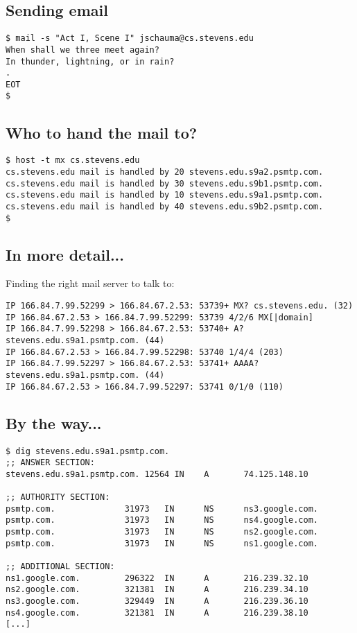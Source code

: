 \documentclass[xga]{xdvislides}
\begin{document}
\subsection{Sending email}
\begin{verbatim}
$ mail -s "Act I, Scene I" jschauma@cs.stevens.edu
When shall we three meet again?
In thunder, lightning, or in rain?
.
EOT
$
\end{verbatim}

\subsection{Who to hand the mail to?}
\newcommand{\smallish}{\fontsize{16}{16}\selectfont}
\begin{verbatim}
$ host -t mx cs.stevens.edu
cs.stevens.edu mail is handled by 20 stevens.edu.s9a2.psmtp.com.
cs.stevens.edu mail is handled by 30 stevens.edu.s9b1.psmtp.com.
cs.stevens.edu mail is handled by 10 stevens.edu.s9a1.psmtp.com.
cs.stevens.edu mail is handled by 40 stevens.edu.s9b2.psmtp.com.
$
\end{verbatim}
\Normalsize

\subsection{In more detail...}
Finding the right mail server to talk to:
\begin{verbatim}
IP 166.84.7.99.52299 > 166.84.67.2.53: 53739+ MX? cs.stevens.edu. (32)
IP 166.84.67.2.53 > 166.84.7.99.52299: 53739 4/2/6 MX[|domain]
IP 166.84.7.99.52298 > 166.84.67.2.53: 53740+ A? stevens.edu.s9a1.psmtp.com. (44)
IP 166.84.67.2.53 > 166.84.7.99.52298: 53740 1/4/4 (203)
IP 166.84.7.99.52297 > 166.84.67.2.53: 53741+ AAAA? stevens.edu.s9a1.psmtp.com. (44)
IP 166.84.67.2.53 > 166.84.7.99.52297: 53741 0/1/0 (110)
\end{verbatim}
\Normalsize

\subsection{By the way...}
\begin{verbatim}
$ dig stevens.edu.s9a1.psmtp.com.
;; ANSWER SECTION:
stevens.edu.s9a1.psmtp.com. 12564 IN    A       74.125.148.10

;; AUTHORITY SECTION:
psmtp.com.              31973   IN      NS      ns3.google.com.
psmtp.com.              31973   IN      NS      ns4.google.com.
psmtp.com.              31973   IN      NS      ns2.google.com.
psmtp.com.              31973   IN      NS      ns1.google.com.

;; ADDITIONAL SECTION:
ns1.google.com.         296322  IN      A       216.239.32.10
ns2.google.com.         321381  IN      A       216.239.34.10
ns3.google.com.         329449  IN      A       216.239.36.10
ns4.google.com.         321381  IN      A       216.239.38.10
[...]
\end{verbatim}
\end{document}
